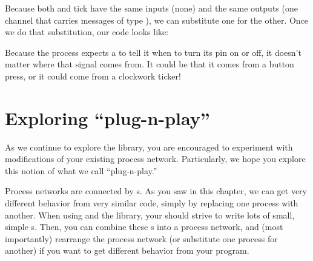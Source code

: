 Because both \bp and {\code tick} have the same inputs (none) and the same outputs (one channel that carries messages of type \SIGNALT), we can substitute one for the other. Once we do that substitution, our code looks like:

\vspace{3mm}


Because the \tp process expects a \SIGNALV to tell it when to turn its pin on or off, it doesn't matter where that signal comes from. It could be that it comes from a button press, or it could come from a clockwork ticker! 

\newpage

\section{Exploring ``plug-n-play''}
As we continue to explore the \plumbing library, you are encouraged to experiment with modifications of your existing process network. Particularly, we hope you explore this notion of what we call ``plug-n-play.'' 

Process networks are connected by {\CHANnel}s. As you saw in this chapter, we can get very different behavior from very similar code, simply by replacing one process with another. When using \occam and the \plumbing library, your should strive to write lots of small, simple {\PROCedure}s. Then, you can combine these {\PROCedure}s into a process network, and (most importantly) rearrange the process network (or substitute one process for another) if you want to get different behavior from your program. 

